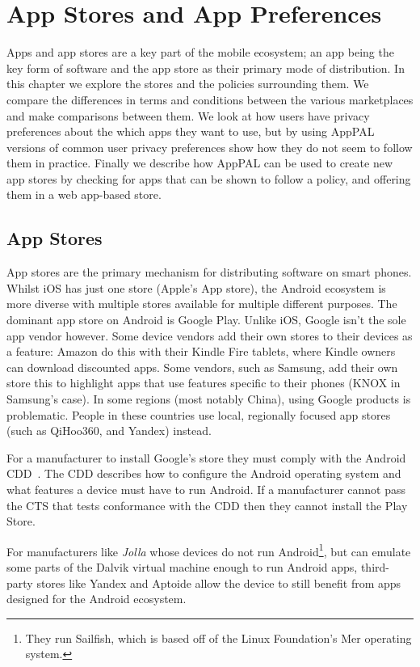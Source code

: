 \documentclass[thesis.tex]{subfiles}
\begin{document}
\chapter{App Stores and App Preferences}
\label{chap:apps-and-stores}

Apps and app stores are a key part of the mobile ecosystem; an app
being the key form of software and the app store as their primary mode
of distribution.  In this chapter we explore the stores and the
policies surrounding them.  We compare the differences in terms and
conditions between the various marketplaces and make comparisons
between them.  We look at how users have privacy preferences about the
which apps they want to use, but by using AppPAL versions of common
user privacy preferences show how they do not seem to follow them in
practice.  Finally we describe how AppPAL can be used to create new
app stores by checking for apps that can be shown to follow a policy,
and offering them in a web app-based store.

\section{App Stores}

App stores are the primary mechanism for distributing software on
smart phones.  Whilst iOS has just one store (Apple's App store), the
Android ecosystem is more diverse with multiple stores available for
multiple different purposes.  The dominant app store on Android is
Google Play.  Unlike iOS, Google isn't the sole app vendor however.
Some device vendors add their own stores to their devices as a
feature: Amazon do this with their Kindle Fire tablets, where Kindle
owners can download discounted apps.  Some vendors, such as Samsung,
add their own store this to highlight apps that use features specific
to their phones (KNOX in Samsung's case).  In some regions (most
notably China), using Google products is problematic. People in these
countries use local, regionally focused app stores (such as QiHoo360,
and Yandex) instead.

For a manufacturer to install Google's store they must comply with the
Android \ac{CDD}~\cite{google_android_2016}.  The \ac{CDD} describes
how to configure the Android operating system and what features a
device must have to run Android.  If a manufacturer cannot pass the
\ac{CTS} that tests conformance with the \ac{CDD} then they cannot
install the Play Store.

For manufacturers like \emph{Jolla} whose devices do not run
Android\footnote{They run Sailfish, which is based off of the Linux
Foundation's Mer operating system.}, but can emulate some parts of the
Dalvik virtual machine enough to run Android apps, third-party stores
like Yandex and Aptoide allow the device to still benefit from apps
designed for the Android ecosystem.
\end{document}
